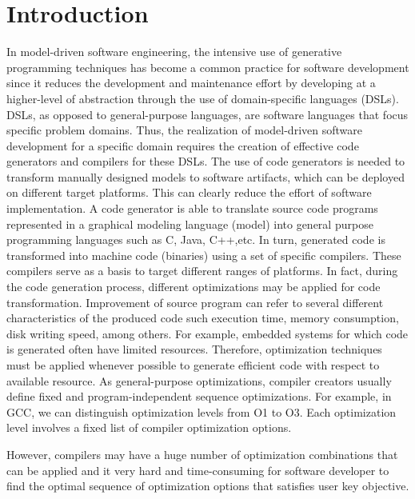 \section{Introduction}
In model-driven software engineering, the intensive use of generative programming techniques has become a common practice for software development since it reduces the development and maintenance effort by developing at a higher-level of abstraction through the use of domain-specific languages (DSLs)\cite{brambilla2012model}. 
DSLs, as opposed to general-purpose languages, are software languages that focus specific problem domains. Thus, the realization of model-driven software development for a specific domain requires the creation of effective code generators and compilers for these DSLs.
The use of code generators is needed to transform manually designed models to software artifacts, which can be deployed on different target platforms. This can clearly reduce the effort of software implementation. A code generator is able to translate source code programs represented in a graphical modeling language (model) into general purpose programming languages such as C, Java, C++,etc. In turn, generated code is transformed into machine code (binaries) using a set of specific compilers.
These compilers serve as a basis to target different ranges of platforms. 
In fact, during the code generation process, different optimizations may be applied for code transformation. Improvement of source program can refer to several different characteristics of the produced code such execution time, memory consumption, disk writing speed, among others.
For example, embedded systems for which code is generated often have limited resources. Therefore, optimization techniques must be applied whenever possible to generate efficient code with respect to available resource. 
As general-purpose optimizations, compiler creators usually
define fixed and program-independent sequence optimizations.
For example, in GCC, we can distinguish optimization levels
from O1 to O3. Each optimization level involves a fixed list of compiler optimization options. 

However, compilers may have a huge number of optimization
combinations that can be applied and it very hard and time-consuming for software developer to find the
optimal sequence of optimization options that satisfies user
key objective. 

